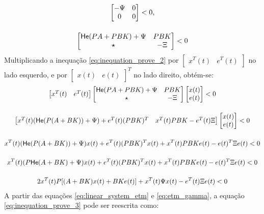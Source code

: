 \begin{gather}
\begin{bmatrix}
    -\Psi & 0 \\ 0 & 0
  \end{bmatrix} < 0, \notag \notag \\[12pt]
  \begin{bmatrix}
    \mathsf{He}(PA + PBK) + \Psi & PBK  \\
    \star                        & -\Xi
  \end{bmatrix} < 0
  \label{eq:inequation_prove_2}
\end{gather} Multiplicando a inequação \eqref{eq:inequation_prove_2} por $\begin{bmatrix}
    x^T(t) & e^T(t)
  \end{bmatrix}$ no lado esquerdo, e por $\begin{bmatrix}
    x(t) & e(t)
  \end{bmatrix}^T$ no lado direito, obtém-se: \begin{gather}
  \begin{bmatrix}
    x^T(t) & e^T(t)
  \end{bmatrix}
  \begin{bmatrix}
    \mathsf{He}(PA + PBK) + \Psi & PBK  \\
    \star                        & -\Xi
  \end{bmatrix}
  \begin{bmatrix}
    x(t) \\ e(t)
  \end{bmatrix} < 0 \notag \\[12pt]
  \begin{bmatrix}
    x^T(t) (\mathsf{He}(P(A + BK)) + \Psi) + e^T(t) (PBK)^T &
    x^T(t) PBK - e^T(t) \Xi
  \end{bmatrix}
  \begin{bmatrix}
    x(t) \\ e(t)
  \end{bmatrix} < 0 \notag \\[12pt]
  x^T(t) (\mathsf{He}(P(A + BK)) + \Psi) x(t) + e^T(t) (PBK)^T x(t) +
  x^T(t) PBK e(t) - e(t)^T \Xi e(t)
  < 0 \notag \\[12pt]
  x^T(t) (P\mathsf{He}(A + BK) + \Psi) x(t) + e^T(t) (PBK)^T x(t) +
  x^T(t) PBK e(t) - e(t)^T \Xi e(t)
  < 0 \notag \\[12pt]
  2x^T(t) P[(A + BK)x(t) + BKe(t)] + x^T(t)\Psi x(t) - e^T(t) \Xi e(t)
  < 0
  \label{eq:inequation_prove_3}
\end{gather}  A partir das equações \eqref{eq:linear_system_etm} e \eqref{eq:etm_gamma}, a equação \eqref{eq:inequation_prove_3} pode ser reescrita como: \begin{gather}

\end{gather}
